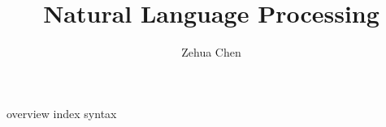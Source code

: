 \documentclass[letterpaper, 11pt]{report}
\title{Natural Language Processing}
\author{Zehua Chen}
\begin{document}
  \maketitle
  \tableofcontents

  {overview}
  {index}
  {syntax}
\end{document}
